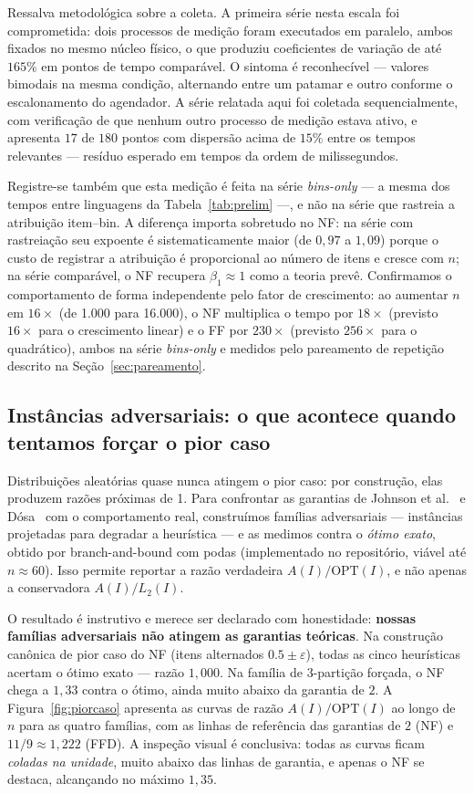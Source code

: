 \documentclass[12pt]{article}
\begin{document}
Ressalva metodológica sobre a coleta. A primeira série nesta escala foi comprometida: dois processos de medição foram executados em paralelo, ambos fixados no mesmo núcleo físico, o que produziu coeficientes de variação de até $165\%$ em pontos de tempo comparável. O sintoma é reconhecível --- valores bimodais na mesma condição, alternando entre um patamar e outro conforme o escalonamento do agendador. A série relatada aqui foi coletada sequencialmente, com verificação de que nenhum outro processo de medição estava ativo, e apresenta $17$ de $180$ pontos com dispersão acima de $15\%$ entre os tempos relevantes --- resíduo esperado em tempos da ordem de milissegundos.

Registre-se também que esta medição é feita na série \textit{bins-only} --- a mesma dos tempos entre linguagens da Tabela~\ref{tab:prelim} ---, e não na série que rastreia a atribuição item--bin. A diferença importa sobretudo no NF: na série com rastreiação seu expoente é sistematicamente maior (de $0{,}97$ a $1{,}09$) porque o custo de registrar a atribuição é proporcional ao número de itens e cresce com $n$; na série comparável, o NF recupera $\beta_1 \approx 1$ como a teoria prevê. Confirmamos o comportamento de forma independente pelo fator de crescimento: ao aumentar $n$ em $16\times$ (de 1.000 para 16.000), o NF multiplica o tempo por $18\times$ (previsto $16\times$ para o crescimento linear) e o FF por $230\times$ (previsto $256\times$ para o quadrático), ambos na série \textit{bins-only} e medidos pelo pareamento de repetição descrito na Seção~\ref{sec:pareamento}.

\subsection{Instâncias adversariais: o que acontece quando tentamos forçar o pior caso} \label{sec:adversarial}

Distribuições aleatórias quase nunca atingem o pior caso: por construção, elas produzem razões próximas de 1. Para confrontar as garantias de Johnson et al.~\cite{johnson1974} e Dósa~\cite{dosa2007} com o comportamento real, construímos famílias adversariais --- instâncias projetadas para degradar a heurística --- e as medimos contra o \emph{ótimo exato}, obtido por branch-and-bound com podas (implementado no repositório, viável até $n \approx 60$). Isso permite reportar a razão verdadeira $A(I)/\mathrm{OPT}(I)$, e não apenas a conservadora $A(I)/L_2(I)$.

O resultado é instrutivo e merece ser declarado com honestidade: \textbf{nossas famílias adversariais não atingem as garantias teóricas}. Na construção canônica de pior caso do NF (itens alternados $0.5 \pm \varepsilon$), todas as cinco heurísticas acertam o ótimo exato --- razão $1{,}000$. Na família de 3-partição forçada, o NF chega a $1{,}33$ contra o ótimo, ainda muito abaixo da garantia de $2$. A Figura~\ref{fig:piorcaso} apresenta as curvas de razão $A(I)/\mathrm{OPT}(I)$ ao longo de $n$ para as quatro famílias, com as linhas de referência das garantias de $2$ (NF) e $11/9 \approx 1{,}222$ (FFD). A inspeção visual é conclusiva: todas as curvas ficam \emph{coladas na unidade}, muito abaixo das linhas de garantia, e apenas o NF se destaca, alcançando no máximo $1{,}35$.
\end{document}
